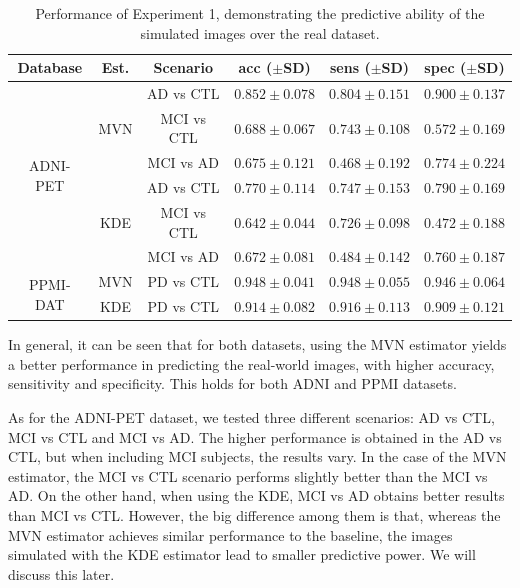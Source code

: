 \begin{table}[htp]
	\renewcommand{\arraystretch}{1.3}
	\centering
	
	\begin{tabular}{cccccc}
		\toprule
		Database  & Est. & Scenario & acc ($\pm$SD) & sens ($\pm$SD) & spec ($\pm$SD)\\
		\midrule
		\multirow{6}{*}{ADNI-PET} & \multirow{3}{*}{\ac{MVN}} & \ac{AD} vs \ac{CTL} & $0.852 \pm 0.078 $ & $0.804 \pm 0.151$ & $0.900 \pm 0.137$\\
		& & \ac{MCI} vs \ac{CTL} & $0.688 \pm 0.067 $ & $0.743 \pm 0.108$ & $0.572 \pm 0.169$\\
		& & \ac{MCI} vs \ac{AD} & $0.675 \pm 0.121 $ & $0.468 \pm 0.192$ & $0.774 \pm 0.224$\\
		\cline{2-6}
		& \multirow{3}{*}{\ac{KDE}} & \ac{AD} vs \ac{CTL} & $0.770 \pm 0.114 $ & $0.747 \pm 0.153$ & $ 0.790 \pm 0.169$\\
		& & \ac{MCI} vs \ac{CTL} & $0.642 \pm 0.044 $ & $0.726 \pm 0.098$ & $0.472 \pm 0.188$\\
		& & \ac{MCI} vs \ac{AD} & $0.672 \pm 0.081 $ & $0.484 \pm 0.142$ & $0.760 \pm 0.187$\\
		\midrule
		\multirow{2}{*}{PPMI-DAT} & \ac{MVN} & \ac{PD} vs \ac{CTL}  & $0.948 \pm 0.041 $ & $0.948 \pm 0.055 $ & $0.946 \pm 0.064 $\\
		\cline{2-6}
		& \ac{KDE} & \ac{PD} vs \ac{CTL}  & $0.914 \pm 0.082 $ & $0.916 \pm 0.113 $ & $0.909 \pm 0.121 $\\
		\bottomrule
	\end{tabular}
	\vspace{1em}
	\caption{Performance of Experiment 1, demonstrating the predictive ability of the simulated images over the real dataset.}
	\label{tab:exp1Syn}
\end{table}

In general, it can be seen that for both datasets, using the \ac{MVN} estimator yields a better performance in predicting the real-world images, with higher accuracy, sensitivity and specificity. This holds for both ADNI and PPMI datasets. 

As for the ADNI-PET dataset, we tested three different scenarios: \ac{AD} vs \ac{CTL}, \ac{MCI} vs \ac{CTL} and \ac{MCI} vs \ac{AD}. The higher performance is obtained in the \ac{AD} vs \ac{CTL}, but when including \ac{MCI} subjects, the results vary. In the case of the \ac{MVN} estimator, the \ac{MCI} vs \ac{CTL} scenario performs slightly better than the \ac{MCI} vs \ac{AD}. On the other hand, when using the \ac{KDE}, \ac{MCI} vs \ac{AD} obtains better results than \ac{MCI} vs \ac{CTL}. However, the big difference among them is that, whereas the \ac{MVN} estimator achieves similar performance to the baseline, the images simulated with the \ac{KDE} estimator lead to smaller predictive power. We will discuss this later. 

